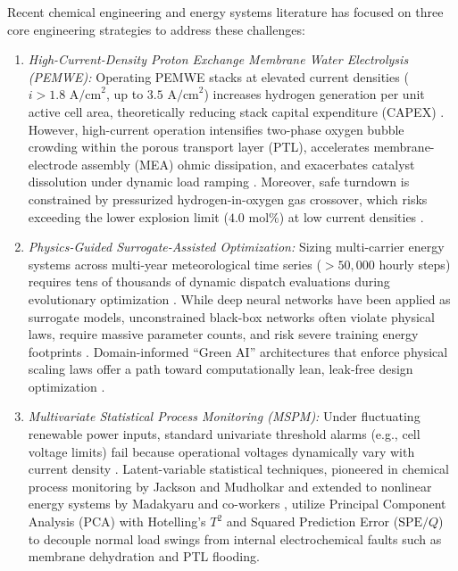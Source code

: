 \documentclass[conference]{IEEEtran}
\begin{document}
Recent chemical engineering and energy systems literature has focused on three core engineering strategies to address these challenges:
\begin{enumerate}
    \item \textit{High-Current-Density Proton Exchange Membrane Water Electrolysis (PEMWE):} Operating PEMWE stacks at elevated current densities ($i > 1.8\text{ A/cm}^2$, up to $3.5\text{ A/cm}^2$) increases hydrogen generation per unit active cell area, theoretically reducing stack capital expenditure (CAPEX) \cite{masampally2026}. However, high-current operation intensifies two-phase oxygen bubble crowding within the porous transport layer (PTL), accelerates membrane-electrode assembly (MEA) ohmic dissipation, and exacerbates catalyst dissolution under dynamic load ramping \cite{carmo2013, bernt2016, rakousky2016}. Moreover, safe turndown is constrained by pressurized hydrogen-in-oxygen gas crossover, which risks exceeding the lower explosion limit ($4.0\text{ mol\%}$) at low current densities \cite{trinke2018}.
    \item \textit{Physics-Guided Surrogate-Assisted Optimization:} Sizing multi-carrier energy systems across multi-year meteorological time series ($>50,000$ hourly steps) requires tens of thousands of dynamic dispatch evaluations during evolutionary optimization \cite{inapakurthi2025}. While deep neural networks have been applied as surrogate models, unconstrained black-box networks often violate physical laws, require massive parameter counts, and risk severe training energy footprints \cite{schwartz2020}. Domain-informed ``Green AI'' architectures that enforce physical scaling laws offer a path toward computationally lean, leak-free design optimization \cite{pujari2026, raissi2019}.
    \item \textit{Multivariate Statistical Process Monitoring (MSPM):} Under fluctuating renewable power inputs, standard univariate threshold alarms (e.g., cell voltage limits) fail because operational voltages dynamically vary with current density \cite{qin2012}. Latent-variable statistical techniques, pioneered in chemical process monitoring by Jackson and Mudholkar \cite{jackson1979} and extended to nonlinear energy systems by Madakyaru and co-workers \cite{madakyaru2024, nounou2012}, utilize Principal Component Analysis (PCA) with Hotelling's $T^2$ and Squared Prediction Error ($\text{SPE}/Q$) to decouple normal load swings from internal electrochemical faults such as membrane dehydration and PTL flooding.
\end{enumerate}
\end{document}
